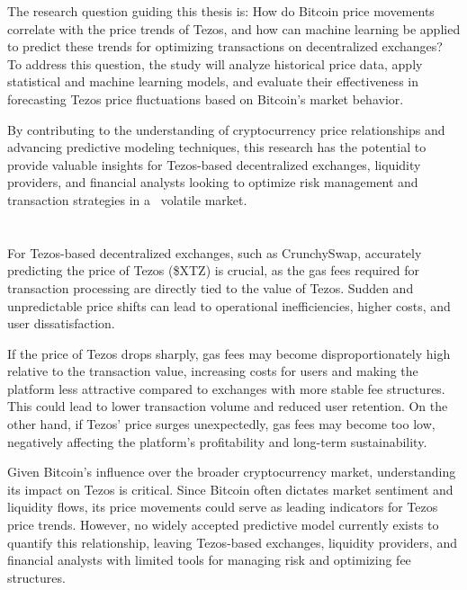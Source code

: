 The research question guiding this thesis is: How do Bitcoin price movements correlate with the price trends of Tezos, and how can machine learning be applied to predict these trends for optimizing transactions on decentralized exchanges? To address this question, the study will analyze historical price data, apply statistical and machine learning models, and evaluate their effectiveness in forecasting Tezos price fluctuations based on Bitcoin’s market behavior.

By contributing to the understanding of cryptocurrency price relationships and advancing predictive modeling techniques, this research has the potential to provide valuable insights for Tezos-based decentralized exchanges, liquidity providers, and financial analysts looking to optimize risk management and transaction strategies in a  volatile market.

\section{}%
\label{sec:probleemstelling}

For Tezos-based decentralized exchanges, such as CrunchySwap, accurately predicting the price of Tezos (\$XTZ) is crucial, as the gas fees required for transaction processing are directly tied to the value of Tezos. Sudden and unpredictable price shifts can lead to operational inefficiencies, higher costs, and user dissatisfaction.

If the price of Tezos drops sharply, gas fees may become disproportionately high relative to the transaction value, increasing costs for users and making the platform less attractive compared to exchanges with more stable fee structures. This could lead to lower transaction volume and reduced user retention. On the other hand, if Tezos' price surges unexpectedly, gas fees may become too low, negatively affecting the platform’s profitability and long-term sustainability.

Given Bitcoin’s influence over the broader cryptocurrency market, understanding its impact on Tezos is critical. Since Bitcoin often dictates market sentiment and liquidity flows, its price movements could serve as leading indicators for Tezos price trends. However, no widely accepted predictive model currently exists to quantify this relationship, leaving Tezos-based exchanges, liquidity providers, and financial analysts with limited tools for managing risk and optimizing fee structures.

